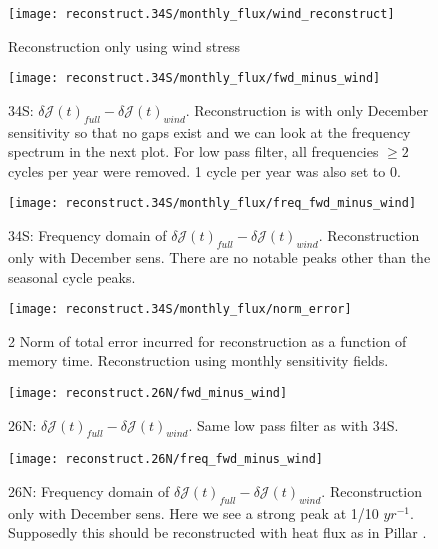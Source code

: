 \documentclass[a4paper,11pt]{article}
\begin{document}
   \begin{figure}
    \centering
    \texttt{[image: reconstruct.34S/monthly\_flux/wind\_reconstruct]}
    \caption{Reconstruction only using wind stress}
    \label{fig:windReconstruct}
   \end{figure}

   \begin{figure}
    \centering
    \texttt{[image: reconstruct.34S/monthly\_flux/fwd\_minus\_wind]}
    \caption{34S: $\delta\mathcal{J}(t)_{full} - \delta\mathcal{J}(t)_{wind}$. Reconstruction is with only December sensitivity so that no gaps exist and we can look at the frequency spectrum in the next plot. For low pass filter, all frequencies $\geq2$ cycles per year were removed. 1 cycle per year was also set to 0. }
    \label{fig:windRecError}
   \end{figure}

   \begin{figure}
    \centering
    \texttt{[image: reconstruct.34S/monthly\_flux/freq\_fwd\_minus\_wind]}
    \caption{34S: Frequency domain of $\delta\mathcal{J}(t)_{full} - \delta\mathcal{J}(t)_{wind}$. Reconstruction only with December sens. There are no notable peaks other than the seasonal cycle peaks.}
    \label{fig:freqWindRecError}
   \end{figure}

   \begin{figure}
    \centering
    \texttt{[image: reconstruct.34S/monthly\_flux/norm\_error]}
    \caption{2 Norm of total error incurred for reconstruction as a function of memory time. Reconstruction using monthly sensitivity fields.}
    \label{fig:reconstructError}
   \end{figure}

   \begin{figure}
    \centering
    \texttt{[image: reconstruct.26N/fwd\_minus\_wind]}
    \caption{26N: $\delta\mathcal{J}(t)_{full} - \delta\mathcal{J}(t)_{wind}$. Same low pass filter as with 34S.}
    \label{fig:windRecError26N}
   \end{figure}

   \begin{figure}
    \centering
    \texttt{[image: reconstruct.26N/freq\_fwd\_minus\_wind]}
    \caption{26N: Frequency domain of $\delta\mathcal{J}(t)_{full} - \delta\mathcal{J}(t)_{wind}$. Reconstruction only with December sens. Here we see a strong peak at 1/10 $yr^{-1}$. Supposedly this should be reconstructed with heat flux as in Pillar \cite{pillar}.}
    \label{fig:freqWindRecError26N}
   \end{figure}
\end{document}
